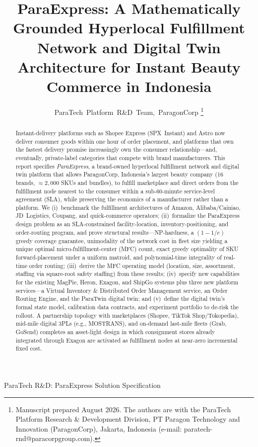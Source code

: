\documentclass[journal]{IEEEtran}
\begin{document}
\title{ParaExpress: A Mathematically Grounded Hyperlocal Fulfillment Network and Digital Twin Architecture for Instant Beauty Commerce in Indonesia}

\author{ParaTech~Platform~R\&D~Team,~ParagonCorp%
\thanks{Manuscript prepared August 2026. The authors are with the ParaTech Platform Research \& Development Division, PT Paragon Technology and Innovation (ParagonCorp), Jakarta, Indonesia (e-mail: paratech-rnd@paracorpgroup.com).}}

%
{ParaTech R\&D: ParaExpress Solution Specification}

\maketitle

\begin{abstract}
Instant-delivery platforms such as Shopee Express (SPX~Instant) and Astro now deliver consumer goods within one hour of order placement, and platforms that own the fastest delivery promise increasingly own the consumer relationship---and, eventually, private-label categories that compete with brand manufacturers. This report specifies \emph{ParaExpress}, a brand-owned hyperlocal fulfillment network and digital twin platform that allows ParagonCorp, Indonesia's largest beauty company (16 brands, ${\approx}2{,}000$ SKUs and bundles), to fulfill marketplace and direct orders from the fulfillment node nearest to the consumer within a sub-60-minute service-level agreement (SLA), while preserving the economics of a manufacturer rather than a platform. We (i)~benchmark the fulfillment architectures of Amazon, Alibaba/Cainiao, JD~Logistics, Coupang, and quick-commerce operators; (ii)~formalize the ParaExpress design problem as an SLA-constrained facility-location, inventory-positioning, and order-routing program, and prove structural results---NP-hardness, a $(1-1/e)$ greedy coverage guarantee, unimodality of the network cost in fleet size yielding a unique optimal micro-fulfillment-center (MFC) count, exact greedy optimality of SKU forward-placement under a uniform matroid, and polynomial-time integrality of real-time order routing; (iii)~derive the MFC operating model (location, size, assortment, staffing via square-root safety staffing) from these results; (iv)~specify new capabilities for the existing MagPie, Heron, Exagon, and ShipGo systems plus three new platform services---a Virtual Inventory \& Distributed Order Management service, an Order Routing Engine, and the ParaTwin digital twin; and (v)~define the digital twin's formal state model, calibration data contracts, and experiment portfolio to de-risk the rollout. A partnership topology with marketplaces (Shopee, TikTok Shop/Tokopedia), mid-mile digital 3PLs (e.g., MOSTRANS), and on-demand last-mile fleets (Grab, GoSend) completes an asset-light design in which consignment stores already integrated through Exagon are activated as fulfillment nodes at near-zero incremental fixed cost.
\end{abstract}
\end{document}
